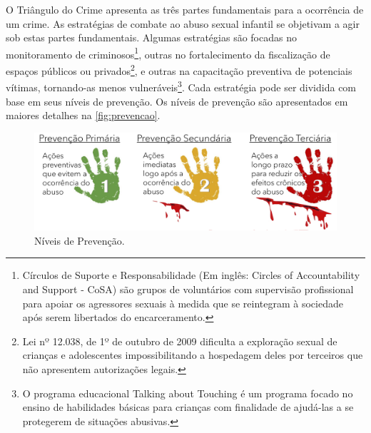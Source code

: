 
O Triângulo do Crime apresenta as três partes fundamentais para a ocorrência de um crime. As estratégias de combate ao abuso sexual infantil se objetivam a agir sob estas partes fundamentais. Algumas estratégias são focadas no monitoramento de criminosos\footnote{\label{note:nota1}Círculos de Suporte e Responsabilidade (Em inglês: Circles of Accountability and Support - CoSA) são grupos de voluntários com supervisão profissional para apoiar os agressores sexuais à medida que se reintegram à sociedade após serem libertados do encarceramento.}, outras no fortalecimento da fiscalização de espaços públicos ou privados\footnote{Lei nº 12.038, de 1º de outubro de 2009 dificulta a exploração sexual de crianças e adolescentes impossibilitando a hospedagem deles por terceiros que não apresentem autorizações legais.}, e outras na capacitação preventiva de potenciais vítimas, tornando-as menos vulneráveis\footnote{O programa educacional Talking about Touching é um programa focado no ensino de habilidades básicas para crianças com finalidade de ajudá-las a se protegerem de situações abusivas.}. Cada estratégia pode ser dividida com base em seus níveis de prevenção. Os níveis de prevenção são apresentados em maiores detalhes na \autoref{fig:prevencao}.

\begin{figure}[htb]
	\caption{\label{fig:prevencao}Níveis de Prevenção.}
  \begin{center}
    \includegraphics[width=\linewidth]{./Figuras/Prevencao.pdf}
	\end{center}
\end{figure}

